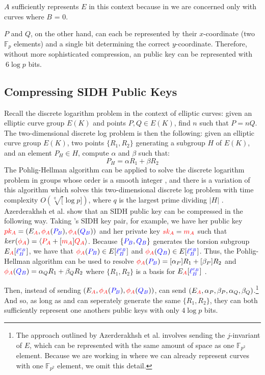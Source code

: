 $A$ sufficiently represents $E$ in this context because in \sidh we are concerned only with curves where $B$ = 0. 

$P$ and $Q$, on the other hand, can each be represented by their $x$-coordinate (two $\mathbb{F}_{p}$ elements) and a single bit determining the correct $y$-coordinate. Therefore, without more sophisticated compression, an \sidh public key can be represented with $~6\log p$ bits.

\subsection{Compressing SIDH Public Keys}
\label{subsec:azercompression}

Recall the discrete logarithm problem in the context of elliptic curves: given an elliptic curve group $E(K)$ and points $P, Q \in E(K)$, find $n$ such that $P = nQ$. The two-dimensional discrete log problem is then the following: given an elliptic curve group $E(K)$, two points $\{R_1, R_2\}$ generating a subgroup $H$ of $E(K)$, and an element $P_{H} \in H$, compute $\alpha$ and $\beta$ such that:
$$
P_{H} = \alpha R_1 + \beta R_2
$$
The Pohlig-Hellman algorithm can be applied to solve the discrete logarithm problem in groups whose order is a smooth integer \cite{ph}, and there is a variation of this algorithm which solves this two-dimensional discrete log problem with time complexity $O(\sqrt[q][\log p])$, where $q$ is the largest prime dividing $\vert H\vert$ \cite{genph}.\\

\noindent
Azerderakhsh et al. show that an SIDH public key can be compressed in the following way. Taking \alice's SIDH key pair, for example, we have her public key $\textcolor{red}{pk_A} = (E_{\textcolor{red}{A}}, \textcolor{red}{\phi_A}(\textcolor{blue}{P_B}),\textcolor{red}{\phi_A}(\textcolor{blue}{Q_B}))$ and her private key $\textcolor{red}{sk_A} = \textcolor{red}{m_A}$ such that $ker(\textcolor{red}{\phi_A}) = \langle \textcolor{red}{P_A} + [\textcolor{red}{m_A}]\textcolor{red}{Q_A}\rangle$. Because $\{\textcolor{blue}{P_B}, \textcolor{blue}{Q_B}\}$ generates the torsion subgroup $E
_{\textcolor{red}{A}}[\textcolor{blue}{\ell_{B}^{e_B}}]$, we have that $\textcolor{red}{\phi_A}(\textcolor{blue}{P_B}) \in E[\textcolor{blue}{\ell_{B}^{e_B}}]$ and $\textcolor{red}{\phi_A}(\textcolor{blue}{Q_B}) \in E[\textcolor{blue}{\ell_{B}^{e_B}}]$. Thus, the Pohlig-Hellman algorithm can be used to resolve $\textcolor{red}{\phi_A}(\textcolor{blue}{P_B}) = [\alpha_P] R_1 + [\beta_P] R_2$ and $\textcolor{red}{\phi_A}(\textcolor{blue}{Q_B}) = \alpha_Q R_1 + \beta_Q R_2$ where $\{R_1, R_2\}$ is a basis for $E_{\textcolor{red}{A}}[\textcolor{blue}{\ell_{B}^{e_B}}]$ \cite{compwr}.

Then, instead of sending \bob $(E_{\textcolor{red}{A}}, \textcolor{red}{\phi_A}(\textcolor{blue}{P_B}),\textcolor{red}{\phi_A}(\textcolor{blue}{Q_B}))$, \alice can send $(E_{\textcolor{red}{A}}, \alpha_P, \beta_P, \alpha_Q, \beta_Q)$.\footnote{The approach outlined by Azerderakhsh et al. involves sending the $j$-invariant of $E$, which can be represented with the same amount of space as one $\mathbb{F}_{p^2}$ element. Because we are working in \sidh where we can already represent curves with one $\mathbb{F}_{p^2}$ element, we omit this detail.} And so, as long as \alice and \bob can seperately generate the same $\{R_1, R_2\}$, they can both sufficiently represent one anothers public keys with only $4\log p$ bits.\\

